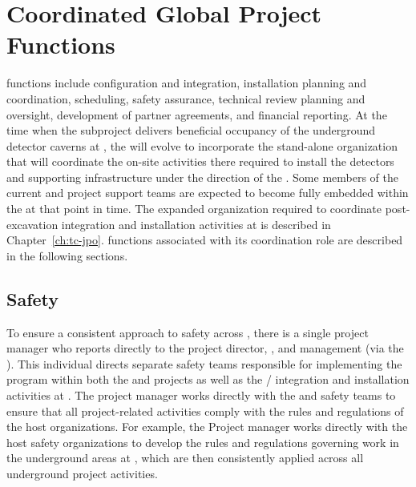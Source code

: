 \section{Coordinated Global Project Functions}
\label{sec:global_project}

 functions include  configuration and 
integration, installation planning and coordination, scheduling, 
safety assurance, technical review planning and oversight, 
development of partner agreements, and financial reporting.  At 
the time when the   subproject delivers 
beneficial occupancy of the underground detector caverns at 
, the  will evolve to incorporate the 
stand-alone organization that will coordinate the 
on-site activities there required to install the detectors and 
supporting infrastructure under the direction of the .  
Some members of the current  and  project 
support teams are expected to become fully embedded within the 
 at that point in time.  The expanded  
organization required to coordinate post-excavation integration 
and installation activities at  is described in 
Chapter~\ref{ch:tc-jpo}.   functions associated with 
its  coordination role are described in the 
following sections.

\subsection{Safety}
\label{sec:dune_safety}

To ensure a consistent approach to safety across ,
there is a single project  manager who reports directly 
to the  project director, , and 
management (via the  ).  This individual
directs separate safety teams responsible for implementing the 
  program within both the  
and  projects as well as the /
integration and installation activities at .  The 
project  manager works directly with the  
and  safety teams to ensure that all project-related 
activities comply with the rules and regulations of the host 
organizations.  For example, the Project  manager 
works directly with the host safety organizations to develop the 
rules and regulations governing work in the underground areas 
at , which are then consistently applied across all 
underground project activities.

